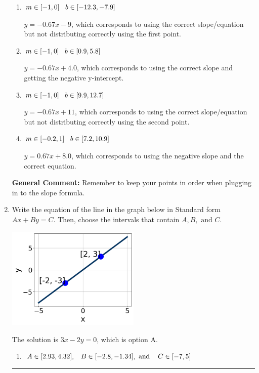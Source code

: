 \documentclass{extbook}[14pt]
\newcommand{\litem}[1]{\item #1

\rule{\textwidth}{0.4pt}}
\begin{document}
\begin{enumerate}
{\begin{enumerate}[label=\Alph*.]
* $y = -0.67x -4.0$, which is the correct option.
\item \( m \in [-1, 0] \hspace*{3mm} b \in [-12.3, -7.9] \)

 $y = -0.67x -9$, which corresponds to using the correct slope/equation but not distributing correctly using the first point.
\item \( m \in [-1, 0] \hspace*{3mm} b \in [0.9, 5.8] \)

 $y = -0.67x + 4.0$, which corresponds to using the correct slope and getting the negative y-intercept.
\item \( m \in [-1, 0] \hspace*{3mm} b \in [9.9, 12.7] \)

 $y = -0.67x + 11$, which corresponds to using the correct slope/equation but not distributing correctly using the second point.
\item \( m \in [-0.2, 1] \hspace*{3mm} b \in [7.2, 10.9] \)

 $y = 0.67x + 8.0$, which corresponds to using the negative slope and the correct equation.
\end{enumerate}

\textbf{General Comment:} Remember to keep your points in order when plugging in to the slope formula.
}
\litem{
Write the equation of the line in the graph below in Standard form $Ax+By=C$. Then, choose the intervals that contain $A, B, \text{ and } C$.

\begin{center}
    \includegraphics[width=0.5\textwidth]{../Figures/linearGraphToStandardCopyB.png}
\end{center}


The solution is \( 3x - 2y = 0 \), which is option A.\begin{enumerate}[label=\Alph*.]
\item \( A \in [2.93, 4.32], \hspace{3mm} B \in [-2.8, -1.34], \text{ and } \hspace{3mm} C \in [-7, 5] \)


\end{enumerate}}
\end{enumerate}
\end{document}
